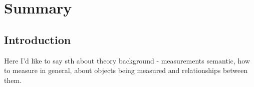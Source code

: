 %


\chapter{Summary}
\label{cha:summary}



\section{Introduction}
\label{sec:ch8_introdocution}

Here I'd like to say sth about theory background - measurements semantic, how to measure in general, about objects
being measured and relationships between them.













